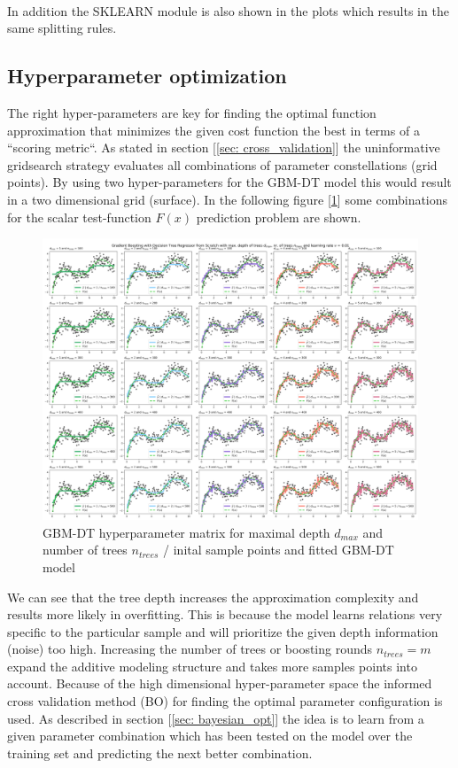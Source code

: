 \documentclass[12pt, a4paper]{article}
\begin{document}
\\
In addition the SKLEARN module \cite{Scikit2023} is also shown in the plots which results in the same splitting rules.
\newpage
\subsection{Hyperparameter optimization}
The right hyper-parameters are key for finding the optimal function approximation that minimizes the given cost function the best in terms of a ``scoring metric``. As stated in section [\ref{sec: cross_validation}] the uninformative gridsearch strategy evaluates all combinations of parameter constellations (grid points). By using two hyper-parameters for the GBM-DT model this would result in a two dimensional grid (surface). In the following figure [\ref{fig: gbm_hyper_matrix}] some combinations for the scalar test-function $F(x)$ prediction problem are shown.
\begin{figure}[!htpb]
    \centering
    \includegraphics[width=1\textwidth,trim={0.5 0 0 0},clip]{figures/gbm_with_decision_tree_various_parameters.png}
    \caption[GBM-DT hyperparameter matrix]{GBM-DT hyperparameter matrix for maximal depth $d_{max}$ and number of trees $n_{trees}$ / inital sample points and fitted GBM-DT model}
    \label{fig: gbm_hyper_matrix}    
\end{figure}
We can see that the tree depth increases the approximation complexity and results more likely in overfitting. This is because the model learns relations very specific to the particular sample and will prioritize the given depth information (noise) too high. Increasing the number of trees or boosting rounds $n_{trees} = m$ expand the additive modeling structure and takes more samples points into account. Because of the high dimensional hyper-parameter space the informed cross validation method (BO) for finding the optimal parameter configuration is used.
As described in section [\ref{sec: bayesian_opt}] the idea is to learn from a given parameter combination which has been tested on the model over the training set and predicting the next better combination.
\end{document}
